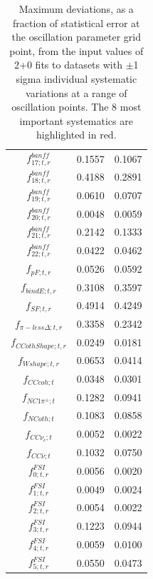 \begin{table}
\begin{tabular}{| c | c | c |}
$f_{17; t, r}^{banff}$	 & 0.1557	 & 0.1067 \\
{\color{red}$f_{18; t, r}^{banff}$}	 & 0.4188	 & 0.2891 \\
$f_{19; t, r}^{banff}$	 & 0.0610	 & 0.0707 \\
$f_{20; t, r}^{banff}$	 & 0.0048	 & 0.0059 \\
$f_{21; t, r}^{banff}$	 & 0.2142	 & 0.1333 \\
$f_{22; t, r}^{banff}$	 & 0.0422	 & 0.0462 \\
$f_{pF; t, r}$	 & 0.0526	 & 0.0592 \\
{\color{red}$f_{bindE; t, r}$}	 & 0.3108	 & 0.3597 \\
{\color{red}$f_{SF; t, r}$}	 & 0.4914	 & 0.4249 \\
{\color{red}$f_{\pi-less\Delta; t, r}$}	 & 0.3358	 & 0.2342 \\
$f_{CCothShape; t, r}$	 & 0.0249	 & 0.0181 \\
$f_{Wshape; t, r}$	 & 0.0653	 & 0.0414 \\
$f_{CCcoh; t}$	 & 0.0348	 & 0.0301 \\
$f_{NC1\pi^\pm; t}$	 & 0.1282	 & 0.0941 \\
$f_{NCoth; t}$	 & 0.1083	 & 0.0858 \\
$f_{CC\nu_e; t}$	 & 0.0052	 & 0.0022 \\
$f_{CC\bar{\nu}; t}$	 & 0.1032	 & 0.0750 \\
$f_{0; t, r}^{FSI}$	 & 0.0056	 & 0.0020 \\
$f_{1; t, r}^{FSI}$	 & 0.0049	 & 0.0024 \\
$f_{2; t, r}^{FSI}$	 & 0.0054	 & 0.0022 \\
$f_{3; t, r}^{FSI}$	 & 0.1223	 & 0.0944 \\
$f_{4; t, r}^{FSI}$	 & 0.0059	 & 0.0100 \\
$f_{5; t, r}^{FSI}$	 & 0.0550	 & 0.0473 \\

\hline
\end{tabular}
\caption{
  Maximum deviations, as a fraction of statistical error at the oscillation parameter grid point, from the input values of 2+0 fits to datasets 
  with $\pm$1 sigma individual systematic variations at a 
  range of oscillation points. The 8 most important systematics are highlighted in red.
}
\label{tab:star_summary}
\end{table}

